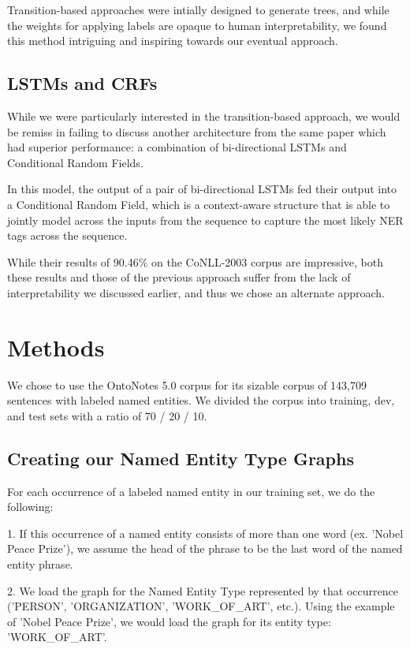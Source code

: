\documentclass[11pt,a4paper]{article}
\begin{document}
Transition-based approaches were intially designed to generate trees, and while the weights for applying labels are opaque to human interpretability, we found this method intriguing and inspiring towards our eventual approach.

\subsection{LSTMs and CRFs}

While we were particularly interested in the transition-based approach, we would be remiss in failing to discuss another architecture from the same paper\cite{LampleNeuralArchitecturesNamed2016} which had superior performance: a combination of bi-directional LSTMs and Conditional Random Fields.

In this model, the output of a pair of bi-directional LSTMs fed their output into a Conditional Random Field, which is a context-aware structure that is able to jointly model across the inputs from the sequence to capture the most likely NER tags across the sequence.

While their results of 90.46\% on the CoNLL-2003 corpus are impressive, both these results and those of the previous approach suffer from the lack of interpretability we discussed earlier, and thus we chose an alternate approach.

\section{Methods} \label {methods}

We chose to use the OntoNotes 5.0 corpus for its sizable corpus of 143,709 sentences with labeled named entities. We divided the corpus into training, dev, and test sets with a ratio of 70 / 20 / 10.

\subsection{Creating our Named Entity Type Graphs} \label{construct_net}

For each occurrence of a labeled named entity in our training set, we do the following:

1. If this occurrence of a named entity consists of more than one word (ex. 'Nobel Peace Prize'), we assume the head of the phrase to be the last word of the named entity phrase.

2. We load the graph for the Named Entity Type represented by that occurrence ('PERSON', 'ORGANIZATION', 'WORK\_OF\_ART', etc.). Using the example of 'Nobel Peace Prize', we would load the graph for its entity type: 'WORK\_OF\_ART'.
\end{document}
